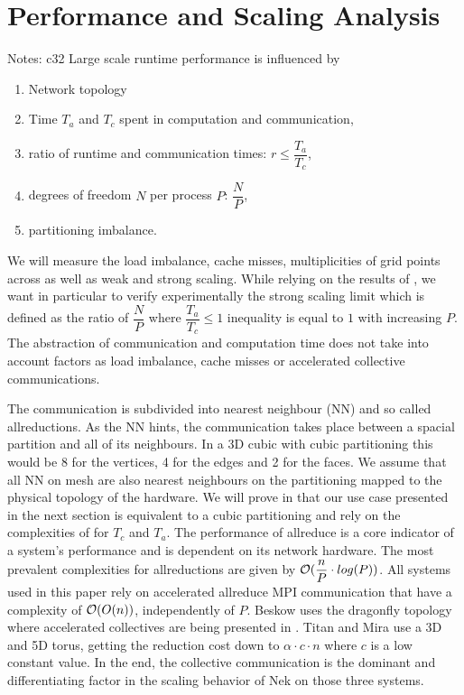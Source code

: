 \documentclass{sig-alternate}
\begin{document}

\section{Performance and Scaling Analysis}
\label{sec:analysis}
Notes: c32
Large scale runtime performance is influenced by 
\begin{enumerate}
  \item Network topology
  \item Time $T_a$ and $T_c$ spent in computation and communication,
  \item ratio of runtime and communication times: $r \leq \dfrac{T_a}{T_c}$,
  \item degrees of freedom $N$ per process $P$: $\dfrac{N}{P}$,
  \item partitioning imbalance.
\end{enumerate}

We will measure the load imbalance, cache misses, multiplicities of grid points
across as well as weak and strong scaling.
While relying on the results of \cite{tufo:terascale}, we want in particular to verify
experimentally the strong scaling limit which is defined as the ratio of $\dfrac{N}{P}$ where
$\dfrac{T_a}{T_c}\leq 1$ inequality is equal to $1$ with increasing $P$. The
abstraction of communication and computation time does not take into account
factors as load imbalance, cache misses or accelerated collective communications.

The communication is subdivided into nearest neighbour (NN) and so called
allreductions. As the NN hints, the communication takes place between a spacial
partition and all of its neighbours. In a 3D cubic with cubic partitioning this
would be 8 for the vertices, 4 for the edges and 2 for the faces. We assume that
all NN on mesh are also nearest neighbours on the partitioning mapped to the
physical topology of the hardware. We will prove in 
that our use case presented in the next section is equivalent to a cubic
partitioning and rely on the complexities of \cite{fischer:scaling} for $T_c$ and
$T_a$. The performance of allreduce is a core indicator of a system's
performance and is dependent on its network hardware. The most prevalent
complexities for allreductions are given by $\mathcal{O}(\dfrac{n}{P}\cdot log(P))$. All
systems used in this paper rely on accelerated allreduce MPI communication that have
a complexity of $\mathcal{O}(O(n))$, independently of $P$. Beskow uses the dragonfly
topology where accelerated collectives are being presented in
\cite{jain2012collectives}. Titan and Mira use a 3D and 5D torus, getting the
reduction cost down to $\alpha \cdot c \cdot n$ where $c$ is a low constant
value. In the end, the collective communication is the dominant and
differentiating factor in the scaling behavior of Nek on those three systems.
\end{document}
